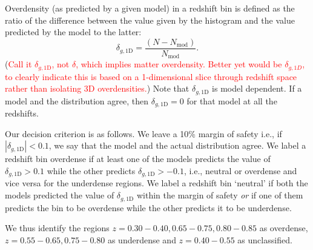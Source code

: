 \documentclass[twocolumn,useAMS,usenatbib]{mn2e}
\newcommand{\rachel}[1]{{\textcolor{red}{#1}}}
\begin{document}
Overdensity (as predicted by a given model) in a redshift bin is defined as the ratio of the
difference between the value given by the histogram and the value
predicted by the model to the latter:
\begin{equation}
\delta_{g,\text{1D}}=\frac{(N-N_{\text{mod}})}{N_{\text{mod}}}.  
\end{equation}
(\rachel{Call it $\delta_{g,\text{1D}}$, not $\delta$, which implies matter
  overdensity.  Better yet would be $\delta_{g,1D}$, to clearly
  indicate this is based on a 1-dimensional slice through redshift
  space rather than isolating 3D overdensities.})
Note that $\delta_{g,\text{1D}}$ is model dependent. If a model and the distribution agree, then $\delta_{g,\text{1D}}=0$ for that model at all the redshifts. 

Our decision criterion is as follows. We leave a 10\% margin of safety i.e., if $\left| \delta_{g,\text{1D}} \right| < 0.1$, we say that the model and the actual distribution agree.
We label a redshift bin overdense if at least one of the models predicts the value of $\delta_{g,\text{1D}} > 0.1$ while the other predicts $\delta_{g,\text{1D}} > -0.1$, i.e.,
neutral or overdense and vice versa for the underdense regions. We label a redshift bin `neutral' if both the models predicted the value of $\delta_{g,\text{1D}}$ within the margin of safety 
\emph{or} if one of them predicts the bin to be overdense while the other predicts it to be underdense.


We thus identify the regions $z=0.30-0.40, 0.65-0.75, 0.80-0.85$ as overdense, $z=0.55-0.65, 0.75-0.80$ as underdense and $z=0.40-0.55$ as unclassified. 
\end{document}
